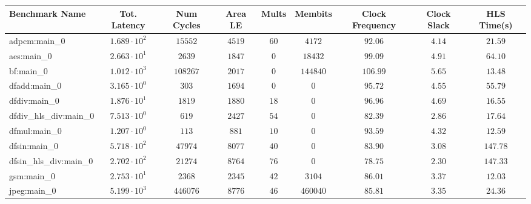 \begin{tabular}{|l|c|c|c|c|c|c|c|c|}
\hline
Benchmark Name          & Tot. Latency           & Num Cycles & Area LE   & Mults   & Membits    & Clock Frequency & Clock Slack & HLS Time(s) \\
\hline
adpcm:main\_0           & $ 1.689 \cdot 10^{2} $ & $ 15552  $ & $ 4519  $ & $ 60  $ & $ 4172   $ & $ 92.06       $ & $ 4.14    $ & $ 21.59   $ \\
aes:main\_0             & $ 2.663 \cdot 10^{1} $ & $ 2639   $ & $ 1847  $ & $ 0   $ & $ 18432  $ & $ 99.09       $ & $ 4.91    $ & $ 64.10   $ \\
bf:main\_0              & $ 1.012 \cdot 10^{3} $ & $ 108267 $ & $ 2017  $ & $ 0   $ & $ 144840 $ & $ 106.99      $ & $ 5.65    $ & $ 13.48   $ \\
dfadd:main\_0           & $ 3.165 \cdot 10^{0} $ & $ 303    $ & $ 1694  $ & $ 0   $ & $ 0      $ & $ 95.72       $ & $ 4.55    $ & $ 55.79   $ \\
dfdiv:main\_0           & $ 1.876 \cdot 10^{1} $ & $ 1819   $ & $ 1880  $ & $ 18  $ & $ 0      $ & $ 96.96       $ & $ 4.69    $ & $ 16.55   $ \\
dfdiv\_hls\_div:main\_0 & $ 7.513 \cdot 10^{0} $ & $ 619    $ & $ 2427  $ & $ 54  $ & $ 0      $ & $ 82.39       $ & $ 2.86    $ & $ 17.64   $ \\
dfmul:main\_0           & $ 1.207 \cdot 10^{0} $ & $ 113    $ & $ 881   $ & $ 10  $ & $ 0      $ & $ 93.59       $ & $ 4.32    $ & $ 12.59   $ \\
dfsin:main\_0           & $ 5.718 \cdot 10^{2} $ & $ 47974  $ & $ 8077  $ & $ 40  $ & $ 0      $ & $ 83.90       $ & $ 3.08    $ & $ 147.78  $ \\
dfsin\_hls\_div:main\_0 & $ 2.702 \cdot 10^{2} $ & $ 21274  $ & $ 8764  $ & $ 76  $ & $ 0      $ & $ 78.75       $ & $ 2.30    $ & $ 147.33  $ \\
gsm:main\_0             & $ 2.753 \cdot 10^{1} $ & $ 2368   $ & $ 2345  $ & $ 42  $ & $ 3104   $ & $ 86.01       $ & $ 3.37    $ & $ 12.03   $ \\
jpeg:main\_0            & $ 5.199 \cdot 10^{3} $ & $ 446076 $ & $ 8776  $ & $ 46  $ & $ 460040 $ & $ 85.81       $ & $ 3.35    $ & $ 24.36   $ \\

\end{tabular}
